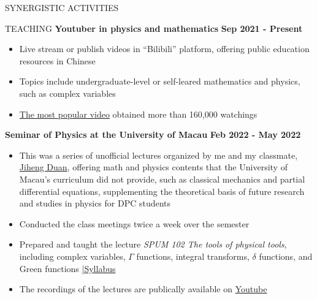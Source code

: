 \documentclass[10pt]{article} %
\begin{document}
\begin{section}{SYNERGISTIC ACTIVITIES}
\begin{section}{TEACHING}
\textbf{Youtuber in physics and mathematics} \hfill \textbf{Sep 2021 - Present}
\begin{itemize}[leftmargin=1.5em]
    \item Live stream or publish videos in ``Bilibili'' platform, offering public education resources in Chinese
    \item Topics include undergraduate-level or self-leared mathematics and physics, such as complex variables
    \item \href{https://www.bilibili.com/video/BV1th411W7xu/}{The most popular video} obtained more than 160,000 watchings
\end{itemize}

\textbf{Seminar of Physics at the University of Macau} \hfill \textbf{Feb 2022 - May 2022}
\begin{itemize}[leftmargin=1.5em]
    \item This was a series of unofficial lectures organized by me and my classmate, \href{http://runawayfancy.me/}{Jiheng Duan}, offering math and physics contents that the University of Macau's curriculum did not provide, such as classical mechanics and partial differential equations, supplementing the theoretical basis of future research and studies in physics for DPC students 
    \item Conducted the class meetings twice a week over the semester
    \item Prepared and taught the lecture \textit{SPUM 102 The tools of physical tools}, including complex variables, $\Gamma$ functions, integral transforms, $\delta$ functions, and Green functions \hfill {\footnotesize \href{https://github.com/Chisen-Lupus/Seminar-of-Physics-UM/blob/main/SPUM%20102%20The%20tools%20of%20physical%20tool.pdf}{|Syllabus}}
    \item The recordings of the lectures are publically available on \href{https://www.youtube.com/watch?v=nQkv03r-XeQ&list=PLV9fHDZW7hHWQ9rrAk7c9kdeV-Lqyt7pV&index=10}{Youtube}
\end{itemize}

\end{section}

\end{section}
\end{document}
